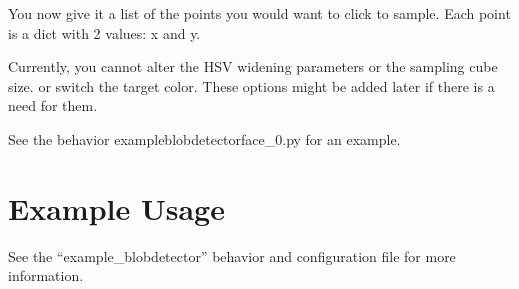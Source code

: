 \documentclass[a4paper, 10pt]{article}
\begin{document}
You now give it a list of the points you would want to click to sample. Each point is a dict with 2 values: x and y.

Currently, you cannot alter the HSV widening parameters or the sampling cube size. or switch the target color. These options might be added later if there is a need for them.

See the behavior exampleblobdetectorface_0.py for an example.

\section{Example Usage}

See the ``example\_blobdetector'' behavior and configuration file for more information.
\end{document}
